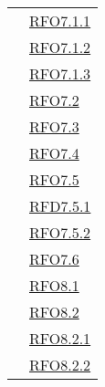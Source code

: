 \begin{longtable}{|>{\centering}m{5cm}|m{5cm}<{\centering}|}
& \hyperlink{RFO7.1.1}{RFO7.1.1}\\
& \hyperlink{RFO7.1.2}{RFO7.1.2}\\
& \hyperlink{RFO7.1.3}{RFO7.1.3}\\
& \hyperlink{RFO7.2}{RFO7.2}\\
& \hyperlink{RFO7.3}{RFO7.3}\\
& \hyperlink{RFO7.4}{RFO7.4}\\
& \hyperlink{RFO7.5}{RFO7.5}\\
& \hyperlink{RFD7.5.1}{RFD7.5.1}\\
& \hyperlink{RFO7.5.2}{RFO7.5.2}\\
& \hyperlink{RFO7.6}{RFO7.6}\\
& \hyperlink{RFO8.1}{RFO8.1}\\
& \hyperlink{RFO8.2}{RFO8.2}\\
& \hyperlink{RFO8.2.1}{RFO8.2.1}\\
& \hyperlink{RFO8.2.2}{RFO8.2.2}\\


\end{longtable}
